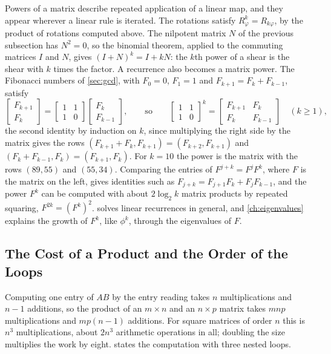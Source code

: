 Powers of a matrix describe repeated application of a linear map, and they appear wherever a linear rule is iterated. The rotations satisfy $R_\varphi^k=R_{k\varphi}$, by the product of rotations computed above. The nilpotent matrix $N$ of the previous subsection has $N^2=0$, so the binomial theorem, applied to the commuting matrices $I$ and $N$, gives $(I+N)^k=I+kN$: the $k$th power of a shear is the shear with $k$ times the factor. A recurrence also becomes a matrix power. The Fibonacci numbers of \cref{sec:gcd}, with $F_0=0$, $F_1=1$ and $F_{k+1}=F_k+F_{k-1}$, satisfy
\[
\begin{bmatrix}F_{k+1}\\F_k\end{bmatrix}=\begin{bmatrix}1&1\\1&0\end{bmatrix}\begin{bmatrix}F_k\\F_{k-1}\end{bmatrix},\qquad\text{so}\qquad\begin{bmatrix}1&1\\1&0\end{bmatrix}^k=\begin{bmatrix}F_{k+1}&F_k\\F_k&F_{k-1}\end{bmatrix}\quad(k\ge1),
\]
the second identity by induction on $k$, since multiplying the right side by the matrix gives the rows $(F_{k+1}+F_k,F_{k+1})=(F_{k+2},F_{k+1})$ and $(F_k+F_{k-1},F_k)=(F_{k+1},F_k)$. For $k=10$ the power is the matrix with the rows $(89,55)$ and $(55,34)$. Comparing the entries of $F^{j+k}=F^jF^k$, where $F$ is the matrix on the left, gives identities such as $F_{j+k}=F_{j+1}F_k+F_jF_{k-1}$, and the power $F^k$ can be computed with about $2\log_2k$ matrix products by repeated squaring, $F^{2k}=(F^k)^2$.  solves linear recurrences in general, and \cref{ch:eigenvalues} explains the growth of $F^k$, like $\phi^k$, through the eigenvalues of $F$.

\subsection{The Cost of a Product and the Order of the Loops}

Computing one entry of $AB$ by the entry reading takes $n$ multiplications and $n-1$ additions, so the product of an $m\times n$ and an $n\times p$ matrix takes $mnp$ multiplications and $mp(n-1)$ additions. For square matrices of order $n$ this is $n^3$ multiplications, about $2n^3$ arithmetic operations in all; doubling the size multiplies the work by eight.  states the computation with three nested loops.

